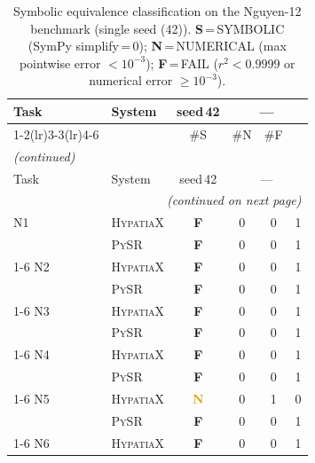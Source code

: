 \newcommand{\symT}{\textcolor{OliveGreen}{\bfseries S}}
\newcommand{\numT}{\textcolor{Goldenrod}{\bfseries N}}
\newcommand{\failT}{\textcolor{BrickRed}{\bfseries F}}

\begin{longtable}{llcccc}
\caption{Symbolic equivalence classification on the Nguyen-12 benchmark
  (single seed (42)).
  \textbf{S}\,=\,SYMBOLIC (SymPy simplify\,=\,0);
  \textbf{N}\,=\,NUMERICAL (max pointwise error $<10^{-3}$);
  \textbf{F}\,=\,FAIL ($r^2 < 0.9999$ or numerical error $\ge 10^{-3}$).}
\label{tab:nguyen12_symequiv}\\
\toprule
\multicolumn{1}{l}{Task} & \multicolumn{1}{l}{System} & \multicolumn{1}{c}{\scriptsize seed\,42} & \multicolumn{3}{c}{\scriptsize —} \\
\cmidrule(lr){1-2}\cmidrule(lr){3-3}\cmidrule(lr){4-6}
 &  & {\scriptsize\#S} & {\scriptsize\#N} & {\scriptsize\#F} \\
\midrule
\endfirsthead
\multicolumn{6}{l}{\small\itshape (continued)} \\
\toprule
\multicolumn{1}{l}{Task} & \multicolumn{1}{l}{System} & \multicolumn{1}{c}{\scriptsize seed\,42} & \multicolumn{3}{c}{\scriptsize —} \\
\midrule
\endhead
\midrule
\multicolumn{6}{r}{\small\itshape (continued on next page)} \\
\endfoot
\bottomrule
\endlastfoot
N1 & \textsc{HypatiaX} & \failT & 0 & 0 & 1 \\
 & \textsc{PySR} & \failT & 0 & 0 & 1 \\
\cmidrule(lr){1-6}
N2 & \textsc{HypatiaX} & \failT & 0 & 0 & 1 \\
 & \textsc{PySR} & \failT & 0 & 0 & 1 \\
\cmidrule(lr){1-6}
N3 & \textsc{HypatiaX} & \failT & 0 & 0 & 1 \\
 & \textsc{PySR} & \failT & 0 & 0 & 1 \\
\cmidrule(lr){1-6}
N4 & \textsc{HypatiaX} & \failT & 0 & 0 & 1 \\
 & \textsc{PySR} & \failT & 0 & 0 & 1 \\
\cmidrule(lr){1-6}
N5 & \textsc{HypatiaX} & \numT & 0 & 1 & 0 \\
 & \textsc{PySR} & \failT & 0 & 0 & 1 \\
\cmidrule(lr){1-6}
N6 & \textsc{HypatiaX} & \failT & 0 & 0 & 1 \\

\end{longtable}
